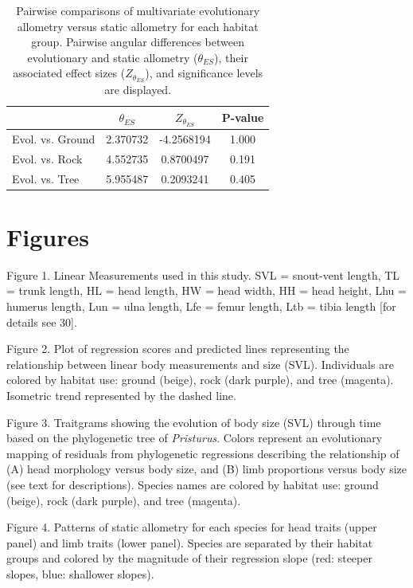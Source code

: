 \documentclass[
  11pt,
]{article}
\begin{document}
\begin{table}[H]

\caption{\label{tab:unnamed-chunk-3}Pairwise comparisons of multivariate evolutionary allometry versus static allometry for each habitat group. Pairwise angular differences between evolutionary and static allometry ($\theta_{ES}$), their associated effect sizes ($Z_{\theta_{ES}}$), and significance levels are displayed.}
\centering
\begin{tabular}[t]{lccc}
\toprule
  & $\theta_{ES}$ & $Z_{\theta_{ES}}$ & P-value\\
\midrule
Evol. vs. Ground & 2.370732 & -4.2568194 & 1.000\\
Evol. vs. Rock & 4.552735 & 0.8700497 & 0.191\\
Evol. vs. Tree & 5.955487 & 0.2093241 & 0.405\\
\bottomrule
\end{tabular}
\end{table}

\newpage

\hypertarget{figures}{%
\section{Figures}\label{figures}}

Figure 1. Linear Measurements used in this study. SVL = snout-vent
length, TL = trunk length, HL = head length, HW = head width, HH = head
height, Lhu = humerus length, Lun = ulna length, Lfe = femur length, Ltb
= tibia length {[}for details see 30{]}.

Figure 2. Plot of regression scores and predicted lines representing the
relationship between linear body measurements and size (SVL).
Individuals are colored by habitat use: ground (beige), rock (dark
purple), and tree (magenta). Isometric trend represented by the dashed
line.

Figure 3. Traitgrams showing the evolution of body size (SVL) through
time based on the phylogenetic tree of \emph{Pristurus}. Colors
represent an evolutionary mapping of residuals from phylogenetic
regressions describing the relationship of (A) head morphology versus
body size, and (B) limb proportions versus body size (see text for
descriptions). Species names are colored by habitat use: ground (beige),
rock (dark purple), and tree (magenta).

Figure 4. Patterns of static allometry for each species for head traits
(upper panel) and limb traits (lower panel). Species are separated by
their habitat groups and colored by the magnitude of their regression
slope (red: steeper slopes, blue: shallower slopes).
\end{document}

